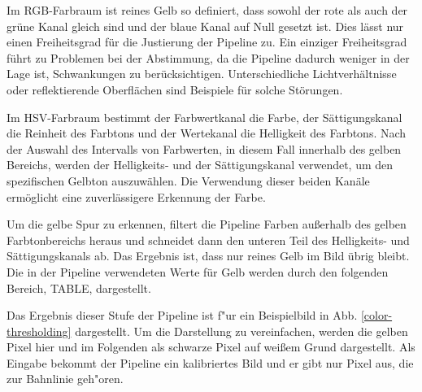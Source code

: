 \documentclass[arbeit=studie,oneside,BCOR=12mm]{ArbeitRST}
\begin{document}
Im RGB-Farbraum ist reines Gelb so definiert, dass sowohl der rote als auch der
grüne Kanal gleich sind und der blaue Kanal auf Null gesetzt ist. Dies lässt
nur einen Freiheitsgrad für die Justierung der Pipeline zu.  Ein einziger
Freiheitsgrad führt zu Problemen bei der Abstimmung, da die Pipeline dadurch
weniger in der Lage ist, Schwankungen zu berücksichtigen. Unterschiedliche
Lichtverhältnisse oder reflektierende Oberflächen sind Beispiele für solche
Störungen.

Im HSV-Farbraum bestimmt der Farbwertkanal die Farbe, der Sättigungskanal die
Reinheit des Farbtons und der Wertekanal die Helligkeit des Farbtons.
\cite{hsv} Nach der Auswahl des Intervalls von Farbwerten, in diesem Fall
innerhalb des gelben Bereichs, werden der Helligkeits- und der Sättigungskanal
verwendet, um den spezifischen Gelbton auszuwählen. Die Verwendung dieser
beiden Kanäle ermöglicht eine zuverlässigere Erkennung der Farbe.

Um die gelbe Spur zu erkennen, filtert die Pipeline Farben außerhalb des gelben
Farbtonbereichs heraus und schneidet dann den unteren Teil des Helligkeits- und
Sättigungskanals ab. Das Ergebnis ist, dass nur reines Gelb im Bild übrig
bleibt. Die in der Pipeline verwendeten Werte für Gelb werden durch den
folgenden Bereich, TABLE, dargestellt.

Das Ergebnis dieser Stufe der Pipeline ist f"ur ein Beispielbild in Abb.
\ref{color-thresholding} dargestellt. Um die Darstellung zu vereinfachen,
werden die gelben Pixel hier und im Folgenden als schwarze Pixel auf wei{\ss}em
Grund dargestellt. Als Eingabe bekommt der Pipeline ein kalibriertes Bild und er
gibt nur Pixel aus, die zur Bahnlinie geh"oren. \\
\end{document}
